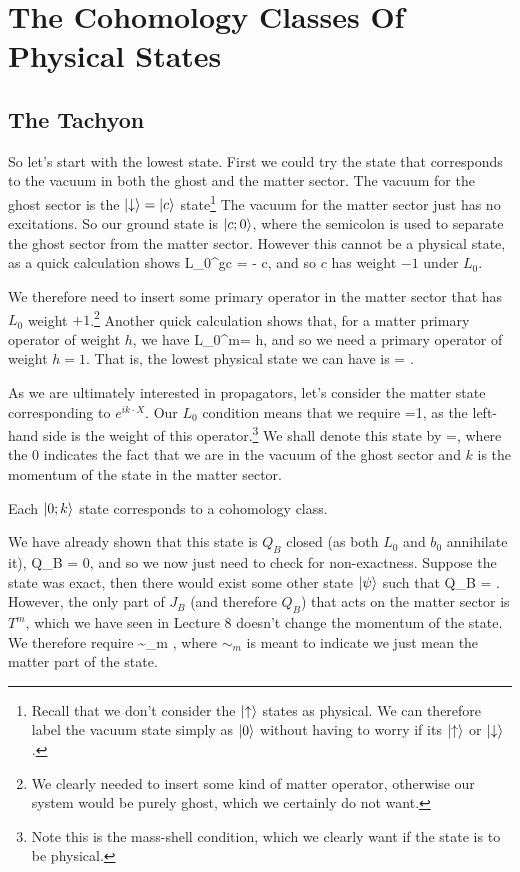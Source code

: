\section{The Cohomology Classes Of Physical States}

\subsection{The Tachyon}

So let's start with the lowest state. First we could try the state that corresponds to the vacuum in both the ghost and the matter sector. The vacuum for the ghost sector is the $\ket{\downarrow} = \ket{c}$ state\footnote{Recall that we don't consider the $\ket{\uparrow}$ states as physical. We can therefore label the vacuum state simply as $\ket{0}$ without having to worry if its $\ket{\uparrow}$ or $\ket{\downarrow}$.} The vacuum for the matter sector just has no excitations. So our ground state is $\ket{c;0}$, where the semicolon is used to separate the ghost sector from the matter sector. However this cannot be a physical state, as a quick calculation shows
\bse 
    L_0^gc = - c,
\ese 
and so $c$ has weight $-1$ under $L_0$. 

We therefore need to insert some primary operator in the matter sector that has $L_0$ weight $+1$.\footnote{We clearly needed to insert some kind of matter operator, otherwise our system would be purely ghost, which we certainly do not want.} Another quick calculation shows that, for a matter primary operator of weight $h$, we have 
\bse 
    L_0^m\cO = h\cO,
\ese 
and so we need a primary operator of weight $h=1$. That is, the lowest physical state we can have is
\bse 
    \ket{\psi} = .
\ese 

As we are ultimately interested in propagators, let's consider the matter state corresponding to $e^{ik\cdot X}$. Our $L_0$ condition means that we require 
\bse 
     =1,
\ese 
as the left-hand side is the weight of this operator.\footnote{Note this is the mass-shell condition, which we clearly want if the state is to be physical.} We shall denote this state by 
\bse 
     =,
\ese 
where the $0$ indicates the fact that we are in the vacuum of the ghost sector and $k$ is the momentum of the state in the matter sector.

\bp 
    Each $\ket{0;k}$ state corresponds to a cohomology class.
\ep 

\bq 
    We have already shown that this state is $Q_B$ closed (as both $L_0$ and $b_0$ annihilate it), 
    \bse 
        Q_B = 0,
    \ese 
    and so we now just need to check for non-exactness. Suppose the state was exact, then there would exist some other state $\ket{\psi}$ such that 
    \bse 
        Q_B\ket{\psi} = .
    \ese 
    However, the only part of $J_B$ (and therefore $Q_B$) that acts on the matter sector is $T^m$, which we have seen in Lecture 8 doesn't change the momentum of the state. We therefore require 
    \bse 
        \ket{\psi} \sim_m ,
    \ese 
    where $\sim_m$ is meant to indicate we just mean the matter part of the state. 
    
